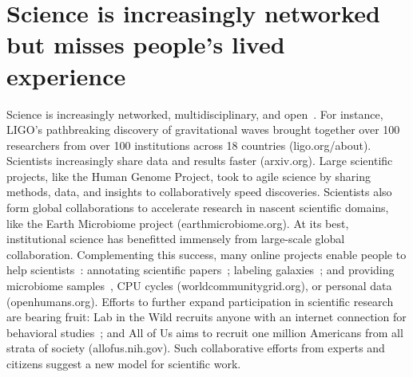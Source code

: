 \vspace{0.25in}

\section{Science is increasingly networked but misses people’s lived experience }
Science is increasingly networked, multidisciplinary, and
open~\cite{Pandey2017}. For instance, LIGO’s pathbreaking discovery of
gravitational waves brought together over 100 researchers
from over 100 institutions across 18 countries (ligo.org/about). 
Scientists increasingly share data and results faster (arxiv.org). 
Large scientific projects, like the Human Genome Project, 
took to agile science by sharing methods, data, and insights to 
collaboratively speed discoveries. Scientists also form global 
collaborations to accelerate research in nascent scientific domains, 
like the Earth Microbiome project (earthmicrobiome.org).
At its best, institutional science has benefitted immensely
from large-scale global collaboration. Complementing this success,
many online projects enable people to help scientists~\cite{Nielsen2012}: annotating 
scientific papers~\cite{Good2013}; labeling galaxies~\cite{JordanRaddick2013}; and providing microbiome 
samples~\cite{McDonald2018}, CPU cycles (worldcommunitygrid.org), or personal data (openhumans.org). 
Efforts to further expand participation in scientific research are bearing fruit: Lab in the Wild 
recruits anyone with an internet connection for behavioral studies~\cite{Reinecke2015}; and All of Us aims 
to recruit one million Americans from all strata of society (allofus.nih.gov). Such collaborative efforts from experts 
and citizens suggest a new model for scientific work.

